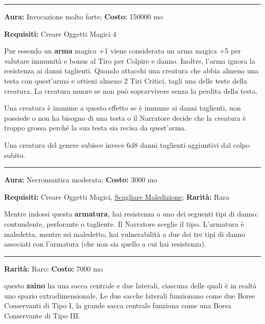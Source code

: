 \begin{multicols}{2}
\smallskip\noindent\rule{\linewidth}{2pt}  \hypertarget{Vorpal}{}\medskip{}\noindent\label{Vorpal}

\textbf{Aura:} Invocazione molto forte; \textbf{Costo:} 150000 mo

\textbf{Requisiti:} Creare Oggetti Magici 4

Pur essendo un \textbf{arma} magica +1 viene considerata un arma magica +5 per valutare immunità e bonus al Tiro per Colpire e danno. Inoltre, l'arma ignora la resistenza ai danni taglienti. Quando attacchi una creatura che abbia almeno una testa con quest'arma e ottieni almeno 2 Tiri Critici, tagli una delle teste della creatura. La creatura muore se non può sopravvivere senza la perdita della testa.

Una creatura è immune a questo effetto se è immune ai danni taglienti, non possiede o non ha bisogno di una testa o il Narratore decide che la creatura è troppo grossa perché la sua testa sia recisa da quest'arma.

Una creatura del genere subisce invece 6d8 danni taglienti aggiuntivi dal colpo subito.

\smallskip\noindent\rule{\linewidth}{2pt}  \hypertarget{Vulnerabilità}{}\medskip{}\noindent\label{Vulnerabilità}

\textbf{Aura:} Necromantica moderata; \textbf{Costo:} 3000 mo

\textbf{Requisiti:} Creare Oggetti Magici, \hyperlink{Scagliare Maledizione}{Scagliare Maledizione}; \textbf{Rarità:} Rara

Mentre indossi questa \textbf{armatura}, hai resistenza a uno dei seguenti tipi di danno: contundente, perforante o tagliente. Il Narratore sceglie il tipo. L'armatura è maledetta, mentre sei maledetto, hai vulnerabilità a due dei tre tipi di danno associati con l'armatura (che non sia quello a cui hai resistenza).

\smallskip\noindent\rule{\linewidth}{2pt}  \hypertarget{ZainettoPratico}{}\medskip{}\noindent\label{ZainettoPratico}

\textbf{Rarità:} Raro; \textbf{Costo:} 7000 mo

questo \textbf{zaino} ha una sacca centrale e due laterali, ciascuna delle quali è in realtà uno spazio extradimensionale.
Le due sacche laterali funzionano come due Borse Conservanti di Tipo I, la grande sacca centrale funziona come una Borsa Conservante di Tipo III.


\end{multicols}

